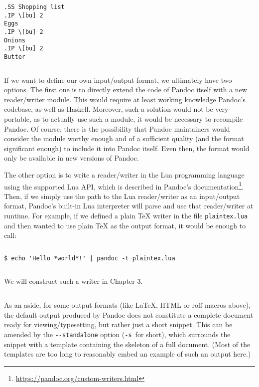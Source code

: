 \documentclass[
  digital,     %
  oneside,     %
  nosansbold,  %
  nocolorbold, %
  lof,         %
  lot,         %
]{fithesis4}
\begin{document}
$ $

\noindent
\begin{lstlisting}
.SS Shopping list
.IP \[bu] 2
Eggs
.IP \[bu] 2
Onions
.IP \[bu] 2
Butter
\end{lstlisting}

$ $

If we want to define our own input/output format, we ultimately have two options. The first one is to directly extend the code of Pandoc itself with a new reader/writer module. This would require at least working knowledge Pandoc's codebase, as well as Haskell. Moreover, such a solution would not be very portable, as to actually use such a module, it would be necessary to recompile Pandoc. Of course, there is the possibility that Pandoc maintainers would consider the module worthy enough and of a sufficient quality (and the format significant enough) to include it into Pandoc itself. Even then, the format would only be available in new versions of Pandoc.

The other option is to write a reader/writer in the Lua programming language using the supported Lua API, which is described in Pandoc's documentation\footnote{\url{https://pandoc.org/custom-writers.html}}. Then, if we simply use the path to the Lua reader/writer as an input/output format, Pandoc's built-in Lua interpreter will parse and use that reader/writer at runtime. For example, if we defined a plain \TeX{} writer in the file \texttt{plaintex.lua} and then wanted to use plain \TeX{} as the output format, it would be enough to call:

$ $

\noindent
\begin{lstlisting}
$ echo 'Hello *world*!' | pandoc -t plaintex.lua
\end{lstlisting}

$ $

We will construct such a writer in Chapter 3.

$ $

As an aside, for some output formats (like \LaTeX{}, HTML or roff macros above), the default output produced by Pandoc does not constitute a complete document ready for viewing/typesetting, but rather just a short snippet. This can be amended by the \texttt{-{}-standalone} option (\texttt{-s}~for short), which surrounds the snippet with a template containing the skeleton of a full document. (Most of the templates are too long to reasonably embed an example of such an output here.)
\end{document}
